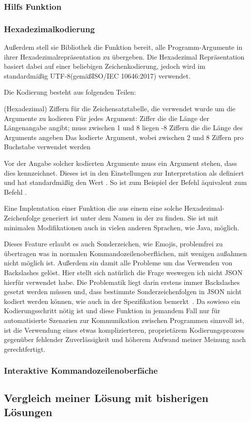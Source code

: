 \subsubsection{Hilfs Funktion}
\subsubsection{Hexadezimalkodierung}\label{Hexadecimalencoding}
Au\ss erdem stell sie Bibliothek die Funktion bereit, alle Programm-Argumente in ihrer Hexadezimalrepräsentation zu übergeben.
Die Hexadezimal Repräsentation  basiert dabei auf einer beliebigen Zeichenkodierung, jedoch wird im standardmä\ss ig UTF-8(gemä\ss  ISO/IEC 10646:2017) verwendet.

Die Kodierung besteht aus folgenden Teilen:
\begin{outline}
  (Hexadezimal) Ziffern für die Zeichensatztabelle, die verwendet wurde um die Argumente zu kodieren
 \1 Für jedes Argument:
   Ziffer die die Länge der Längenangabe angibt;
  muss zwischen 1 und 8 liegen 
  -8 Ziffern die die Länge des Arguments angeben
  \2 Das kodierte Argument, wobei zwischen 2 und 8 Ziffern pro Buchstabe verwendet werden
\end{outline}

Vor der Angabe solcher kodierten Argumente muss ein Argument stehen, dass dies kennzeichnet.
Dieses ist in den Einstellungen zur Interpretation als  definiert und hat standardmä\ss ig den Wert .
So ist zum Beispiel der Befehl  äquivalent zum Befehl .

Eine Implemtation einer Funktion die aus einem  eine solche Hexadezimal-Zeichenfolge generiert ist unter dem Namen  in der  zu finden.
Sie ist mit minimalen Modifikationen auch in vielen anderen Sprachen, wie Java, möglich.

Dieses Feature erlaubt es auch Sonderzeichen, wie Emojis, problemfrei zu übertragen was in normalen Kommandozeilenoberflächen, mit wenigen au\ss ahmen nicht möglich ist.
Au\ss erdem sin damit alle Probleme um das Verwenden von Backslashes gelöst.
Hier stellt sich natürlich die Frage weswegen ich nicht JSON hierfür verwendet habe.
Die Problematik liegt darin erstens immer Backslashes gesetzt werden müssen und, dass bestimmte Sonderzeichenfolgen in JSON nicht kodiert werden können, wie auch in der Spezifikation bemerkt~\cite{JSONSpec}.
Da sowieso ein Kodierungsschritt nötig ist und diese Funktion in jemandem Fall nur für automatisierte Szenarien zur Kommunikation zwischen Programmen sinnvoll ist,
ist die Verwendung eines etwas komplizierteren, proprietärem  Kodierungsprozess gegenüber fehlender Zuverlässigkeit und höherem Aufwand meiner Meinung nach gerechtfertigt.
\subsubsection{Interaktive Kommandozeilenoberfäche}

\subsection{Vergleich meiner Lösung mit bisherigen Lösungen}\label{subsec:Comparison}